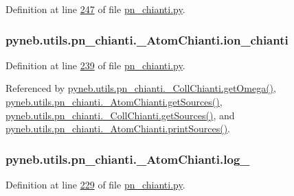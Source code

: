 Definition at line \hyperlink{pn__chianti_8py_source_l00247}{247} of file \hyperlink{pn__chianti_8py_source}{pn\-\_\-chianti.\-py}.

\hypertarget{classpyneb_1_1utils_1_1pn__chianti_1_1___atom_chianti_a97865c9f8fcd274072335cc71fc746a3}{
\subsubsection[{ion\-\_\-chianti}]{\setlength{\rightskip}{0pt plus 5cm}pyneb.\-utils.\-pn\-\_\-chianti.\-\_\-\-Atom\-Chianti.\-ion\-\_\-chianti}}\label{classpyneb_1_1utils_1_1pn__chianti_1_1___atom_chianti_a97865c9f8fcd274072335cc71fc746a3}


Definition at line \hyperlink{pn__chianti_8py_source_l00239}{239} of file \hyperlink{pn__chianti_8py_source}{pn\-\_\-chianti.\-py}.



Referenced by \hyperlink{pn__chianti_8py_source_l00507}{pyneb.\-utils.\-pn\-\_\-chianti.\-\_\-\-Coll\-Chianti.\-get\-Omega()}, \hyperlink{pn__chianti_8py_source_l00393}{pyneb.\-utils.\-pn\-\_\-chianti.\-\_\-\-Atom\-Chianti.\-get\-Sources()}, \hyperlink{pn__chianti_8py_source_l00570}{pyneb.\-utils.\-pn\-\_\-chianti.\-\_\-\-Coll\-Chianti.\-get\-Sources()}, and \hyperlink{pn__chianti_8py_source_l00404}{pyneb.\-utils.\-pn\-\_\-chianti.\-\_\-\-Atom\-Chianti.\-print\-Sources()}.

\hypertarget{classpyneb_1_1utils_1_1pn__chianti_1_1___atom_chianti_a949f340c2041435c590ca066e2797e7d}{
\subsubsection[{log\-\_\-}]{\setlength{\rightskip}{0pt plus 5cm}pyneb.\-utils.\-pn\-\_\-chianti.\-\_\-\-Atom\-Chianti.\-log\-\_\-}}\label{classpyneb_1_1utils_1_1pn__chianti_1_1___atom_chianti_a949f340c2041435c590ca066e2797e7d}


Definition at line \hyperlink{pn__chianti_8py_source_l00229}{229} of file \hyperlink{pn__chianti_8py_source}{pn\-\_\-chianti.\-py}.


